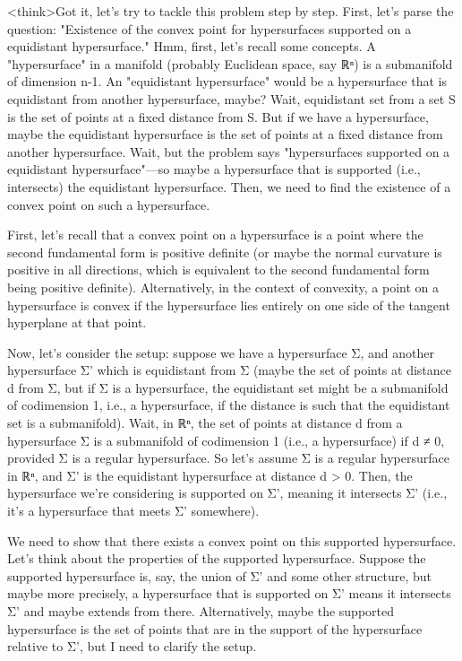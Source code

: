 <think>Got it, let's try to tackle this problem step by step. First, let's parse the question: "Existence of the convex point for hypersurfaces supported on a equidistant hypersurface." Hmm, first, let's recall some concepts. A "hypersurface" in a manifold (probably Euclidean space, say ℝⁿ) is a submanifold of dimension n-1. An "equidistant hypersurface" would be a hypersurface that is equidistant from another hypersurface, maybe? Wait, equidistant set from a set S is the set of points at a fixed distance from S. But if we have a hypersurface, maybe the equidistant hypersurface is the set of points at a fixed distance from another hypersurface. Wait, but the problem says "hypersurfaces supported on a equidistant hypersurface"—so maybe a hypersurface that is supported (i.e., intersects) the equidistant hypersurface. Then, we need to find the existence of a convex point on such a hypersurface.

First, let's recall that a convex point on a hypersurface is a point where the second fundamental form is positive definite (or maybe the normal curvature is positive in all directions, which is equivalent to the second fundamental form being positive definite). Alternatively, in the context of convexity, a point on a hypersurface is convex if the hypersurface lies entirely on one side of the tangent hyperplane at that point.

Now, let's consider the setup: suppose we have a hypersurface Σ, and another hypersurface Σ' which is equidistant from Σ (maybe the set of points at distance d from Σ, but if Σ is a hypersurface, the equidistant set might be a submanifold of codimension 1, i.e., a hypersurface, if the distance is such that the equidistant set is a submanifold). Wait, in ℝⁿ, the set of points at distance d from a hypersurface Σ is a submanifold of codimension 1 (i.e., a hypersurface) if d ≠ 0, provided Σ is a regular hypersurface. So let's assume Σ is a regular hypersurface in ℝⁿ, and Σ' is the equidistant hypersurface at distance d > 0. Then, the hypersurface we're considering is supported on Σ', meaning it intersects Σ' (i.e., it's a hypersurface that meets Σ' somewhere).

We need to show that there exists a convex point on this supported hypersurface. Let's think about the properties of the supported hypersurface. Suppose the supported hypersurface is, say, the union of Σ' and some other structure, but maybe more precisely, a hypersurface that is supported on Σ' means it intersects Σ' and maybe extends from there. Alternatively, maybe the supported hypersurface is the set of points that are in the support of the hypersurface relative to Σ', but I need to clarify the setup.

